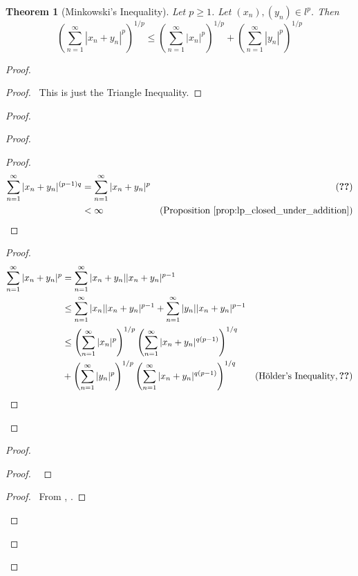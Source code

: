 \documentclass{book}
\let\qed\relax
\newtheorem{thm}[ax]{Theorem}
\theoremstyle{definition}
\begin{document}
\begin{thm}[Minkowski's Inequality]
Let $p \geq 1$. Let $(x_n), (y_n) \in l^p$. Then
\[ \left( \sum_{n=1}^\infty |x_n + y_n|^p \right)^{1/p} \leq \left( \sum_{n=1}^\infty |x_n|^p \right)^{1/p} + \left( \sum_{n=1}^\infty |y_n|^p \right)^{1/p} \]
\end{thm}

\begin{proof}
\pf
{}
\begin{proof}
	\pf\ This is just the Triangle Inequality.
\end{proof}
\begin{proof}
	\begin{proof}
		\pf
		\begin{proof}
			\pf
			\begin{align*}
				\sum_{n=1}^\infty |x_n + y_n|^{(p-1)q} & = \sum_{n=1}^\infty |x_n + y_n|^p & (\text{\stepref{b}}) \\
				& < \infty & (\text{Proposition \ref{prop:lp_closed_under_addition}})
			\end{align*}
		\end{proof}
		\qedstep
		\begin{proof}
		\pf
		\begin{align*}
			\sum_{n=1}^\infty |x_n + y_n|^p
			& = \sum_{n=1}^\infty |x_n + y_n| |x_n + y_n|^{p-1} \\
			& \leq \sum_{n=1}^\infty |x_n| |x_n + y_n|^{p-1} + \sum_{n=1}^\infty |y_n| |x_n + y_n|^{p-1} \\
			& \leq \left( \sum_{n=1}^\infty |x_n|^p \right)^{1/p} \left( \sum_{n=1}^\infty |x_n + y_n|^{q(p-1)} \right)^{1/q} \\
	& + \left( \sum_{n=1}^\infty |y_n|^p \right)^{1/p} \left( \sum_{n=1}^\infty |x_n + y_n|^{q(p-1)} \right)^{1/q} & (\text{H\"{o}lder's Inequality}, \text{\stepref{b}})
		\end{align*}
		\end{proof}
	\end{proof}
	\begin{proof}
		\begin{proof}
			\pf\ 
		\end{proof}
		\qedstep
		\begin{proof}
			\pf\ From , .
		\end{proof}
	\end{proof}
\end{proof}
\qed
\end{proof}
\end{document}
